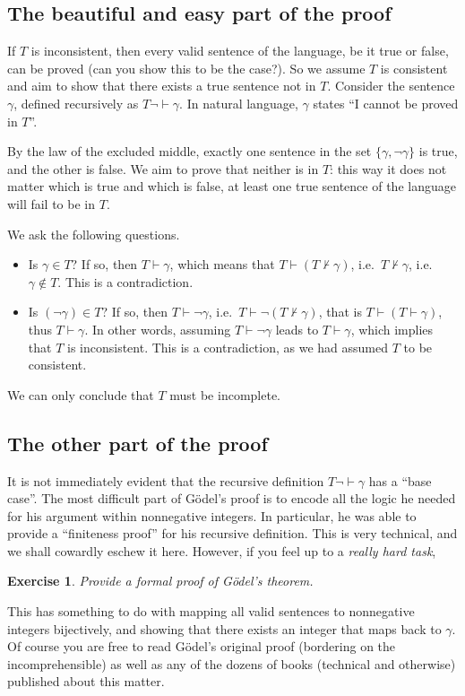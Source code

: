 \documentclass[a4paper]{book}
\theoremstyle{changebreak}                %
\newtheorem{ex}[result]{Exercise}
\begin{document}
\subsection{The beautiful and easy part of the proof}
If $T$ is inconsistent, then every valid
sentence of the language, be it true or false, can be proved (can you
show this to be the case?). So we assume $T$ is consistent and aim to
show that there exists a true sentence not in $T$. Consider the
sentence $\gamma$, defined recursively as $T\neg\vdash\gamma$. In
natural language, $\gamma$ states ``I cannot be proved in $T$''.

By the law of the excluded middle, exactly one sentence in the set
$\{\gamma,\neg\gamma\}$ is true, and the other is false. We aim to
prove that neither is in $T$: this way it does not matter which is
true and which is false, at least one true sentence of the language
will fail to be in $T$.

We ask the following questions.
\begin{itemize}
\item Is $\gamma\in T$? If so, then $T\vdash\gamma$, which means that
  $T\vdash(T\not\vdash\gamma)$, i.e.~$T\not\vdash\gamma$,
  i.e.~$\gamma\not\in T$. This is a contradiction.
\item Is $(\neg\gamma)\in T$? If so, then $T\vdash\neg\gamma$,
  i.e.~$T\vdash\neg(T\not\vdash\gamma)$, that is
  $T\vdash(T\vdash\gamma)$, thus $T\vdash\gamma$. In other words,
  assuming $T\vdash\neg\gamma$ leads to $T\vdash\gamma$, which implies
  that $T$ is inconsistent. This is a contradiction, as we had assumed
  $T$ to be consistent.
\end{itemize}
We can only conclude that $T$ must be incomplete.

\subsection{The other part of the proof}
It is not immediately evident that the recursive definition
$T\neg\vdash\gamma$ has a ``base case''. The most difficult part of
G\"odel's proof is to encode all the logic he needed for his argument
within nonnegative integers. In particular, he was able to provide a
``finiteness proof'' for his recursive definition. This is very
technical, and we shall cowardly eschew it here. However, if you feel
up to a {\it really hard task}, 
\begin{ex}
Provide a formal proof of G\"odel's theorem.
\end{ex}
This has something to do with mapping all valid sentences to
nonnegative integers bijectively, and showing that there exists an
integer that maps back to $\gamma$. Of course you are free to read
G\"odel's original proof (bordering on the incomprehensible) as well
as any of the dozens of books (technical and otherwise) published
about this matter.
\end{document}

